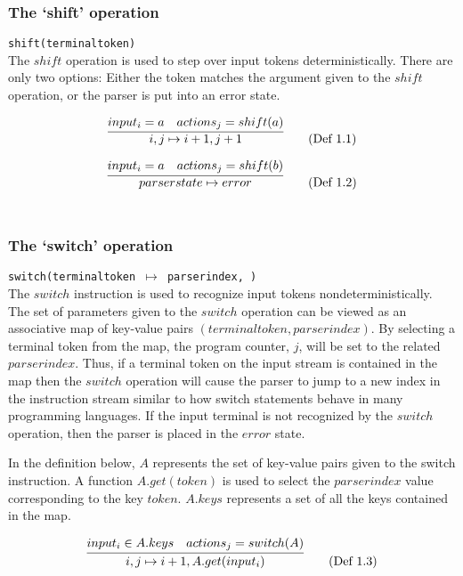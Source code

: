 \documentclass[a4paper,11pt]{article}
\begin{document}
\subsubsection{The `shift' operation}
\texttt{shift(terminaltoken)}\\
The $shi\!ft$ operation is used to step over input tokens deterministically. 
There are only two options: Either the token matches the argument given to the $shi\!ft$ operation, or the parser is put into an error state.

\begin{equation}
\infer{i, j \mapsto i+1, j+1}{input_i = a & actions_j = shift(a)} \tag{Def 1.1}
\end{equation}

\begin{equation}
\infer{parserstate \mapsto error}{input_i = a & actions_j = shift(b)} \tag{Def 1.2}
\end{equation}\\

\subsubsection{The `switch' operation}
\texttt{switch(terminaltoken $\mapsto$ parserindex, \textellipsis)}\\
The $switch$ instruction is used to recognize input tokens nondeterministically.
The set of parameters given to the $switch$ operation can be viewed as an associative map of key-value pairs $(terminaltoken, parserindex)$.
By selecting a terminal token from the map, the program counter, $j$, will be set to the related $parserindex$.
Thus, if a terminal token on the input stream is contained in the map then the $switch$ operation will cause the parser to jump to a new index in 
the instruction stream similar to how switch statements behave in many programming languages.
If the input terminal is not recognized by the $switch$ operation, then the parser is placed in the $error$ state.

In the definition below, $A$ represents the set of key-value pairs given to the switch instruction. 
A function $A.get(token)$ is used to select the $parserindex$ value corresponding to the key $token$.
$A.keys$ represents a set of all the keys contained in the map.

\begin{equation}
\infer{i, j \mapsto i+1, A.get(input_i)}{input_i \in A.keys & actions_j = switch(A)} \tag{Def 1.3}
\end{equation}
\end{document}
